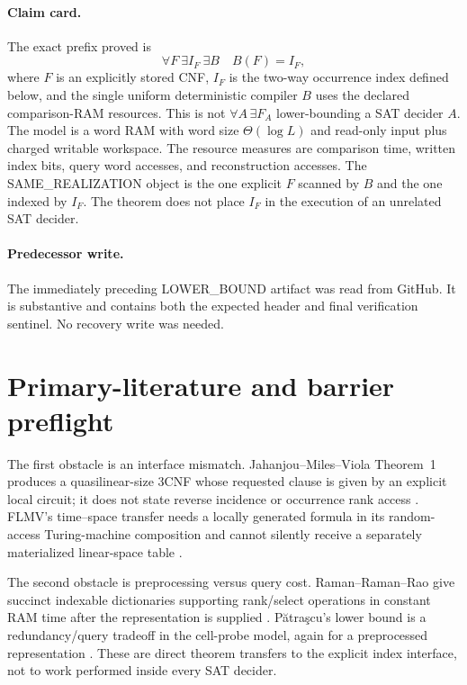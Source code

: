 \documentclass[11pt]{article}
\begin{document}
\paragraph{Claim card.}
The exact prefix proved is
\[
 \forall F\ \exists I_F\ \exists B
 \quad B(F)=I_F,
\]
where $F$ is an explicitly stored CNF, $I_F$ is the two-way occurrence
index defined below, and the single uniform deterministic compiler $B$ uses
the declared comparison-RAM resources.  This is not
$\forall A\,\exists F_A$ lower-bounding a SAT decider $A$.
The model is a word RAM with word size $\Theta(\log L)$ and read-only input
plus charged writable workspace.  The resource measures are comparison
time, written index bits, query word accesses, and reconstruction accesses.
The SAME\_REALIZATION object is the one explicit $F$ scanned by $B$ and the
one indexed by $I_F$.  The theorem does not place $I_F$ in the execution of
an unrelated SAT decider.

\paragraph{Predecessor write.}
The immediately preceding LOWER\_BOUND artifact
was read from GitHub.  It is substantive and contains both the expected
header and final verification sentinel.  No recovery write was needed.

\section{Primary-literature and barrier preflight}

The first obstacle is an interface mismatch.  Jahanjou--Miles--Viola
Theorem~1 produces a quasilinear-size 3CNF whose requested clause is given by
an explicit local circuit; it does not state reverse incidence or occurrence
rank access \cite{jmv}.  FLMV's time--space transfer needs a locally generated
formula in its random-access Turing-machine composition and cannot silently
receive a separately materialized linear-space table \cite{flmv}.

The second obstacle is preprocessing versus query cost.  Raman--Raman--Rao
give succinct indexable dictionaries supporting rank/select operations in
constant RAM time after the representation is supplied \cite{rrr}.
P\u{a}tra\c{s}cu's lower bound is a redundancy/query tradeoff in the
cell-probe model, again for a preprocessed representation \cite{patrascu}.
These are direct theorem transfers to the explicit index interface, not to
work performed inside every SAT decider.
\end{document}
